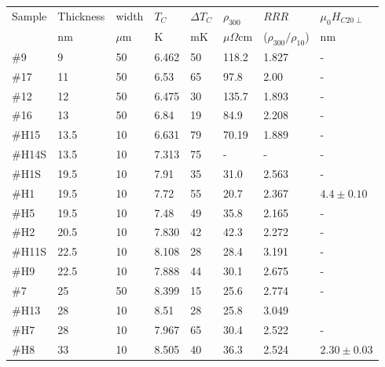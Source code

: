 \documentclass[reprint,onecolumn,superscriptaddress,a4paper,nofootinbib,floatfix]{revtex4-1}
\begin{document}
\begin{table}[h]
\centering 
\begin{tabular}{|l|l|l|l|l|l|l|l|}  %
\hline
 Sample & Thickness & width & $T_C$ & $\Delta T_C$ & {$\rho_{300}$} & {$RRR$} & {$\mu_0H_{C20\perp}$} \\
 { }  &  {nm}  &  {$\mu$m}  &  {K}  &  {mK}  &  {$\mu\Omega$cm}  &  {($\rho_{300}/\rho_{10}$)}  &  {nm}\\
\hline
 {\#9}   &   {9}  &  {50}  & {6.462}  &  {50}  &  {118.2}  &  {1.827}  &  {- }\\
  \hline
 {\#17}   &  {11}  & {50}  & {6.53}  &  {65}  &  {97.8}  &  {2.00}  &  {-}\\ 
\hline 
 {\#12}   &  {12}  &  {50}  & {6.475}  &  {30}  &  {135.7}  &  {1.893}  &  {-}\\
 \hline
  {\#16}  &  {13}  &  {50}  & {6.84}  &  {19}  &  {84.9}  &  {2.208}  &  {-}\\
 \hline
 {\#H15}   &   {13.5}  & {10}  & {6.631}  &  {79}  &  {70.19}  &  {1.889}  &  {-}\\
  \hline
 {\#H14S}   &   {13.5}  & {10}  & {7.313}  &  {75}  & {-}  &  {-}  &  {-}\\
 \hline
 {\#H1S}   &   {19.5}  & {10}  & {7.91}  &  {35}  &  {31.0}  &  {2.563}  &  {-}\\
 \hline
 {\#H1}   &   {19.5}  &  {10}  & {7.72}  &  {55}  &  {20.7}  &  {2.367}  &  {$4.4\pm0.10$}\\
   \hline
 {\#H5}   &   {19.5}  &  {10}  & {7.48}  &  {49}  &  {35.8}  &  {2.165}  &  {-}\\
    \hline
 {\#H2}   &   {20.5}  & {10}  & {7.830}  &  {42}  &  {42.3}  &  {2.272}  &  {-}\\
 \hline
 {\#H11S}   &   {22.5}  &  {10}  & {8.108}  &  {28}  &  {28.4}  &  {3.191}  &  {-}\\
  \hline
 {\#H9}   &   {22.5}  &  {10}  & {7.888}  &  {44}  &  {30.1}  &  {2.675}  &  {-}\\
 \hline
 {\#7}   &   {25}  &  {50}  &  {8.399}  & {15}  &  {25.6}  &  {2.774}  &  {-}\\
  \hline
 {\#H13}   &  {28}   &  {10}  &  {8.51}   & {28} &  {25.8}  &  {3.049}  &  { }\\
 \hline
 {\#H7}   &  {28}   & {10}  & {7.967}  & {65}  &  {30.4}  &  {2.522}  &  {-}\\
 \hline
 {\#H8}   &  {33}   &  {10}  & {8.505}  & {40}  &  {36.3}  &  {2.524}  &  {$2.30\pm0.03$}\\

\end{tabular}
\end{table}
\end{document}
